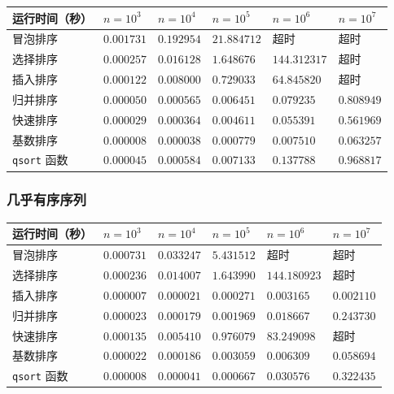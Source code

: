 \documentclass[12pt]{article}
\begin{document}
\begin{center}
  \begin{tabular}{|m{}|m{}|m{}|m{}|m{}|m{}|}
  \hline
  运行时间（秒） & $n=10^3$  & $n=10^4$ & $n=10^5$ & $n=10^6$ & $n=10^7$ \\ 
  \hline
  冒泡排序 & $0.001731$  & $0.192954$ & $21.884712$ & 超时 & 超时 \\ 
  \hline
  选择排序 & $0.000257$  & $0.016128$ & $1.648676$ & $144.312317$ & 超时 \\ 
  \hline
  插入排序 & $0.000122$  & $0.008000$ & $0.729033$ & $64.845820$ & 超时 \\ 
  \hline
  归并排序 & $0.000050$  & $0.000565$ & $0.006451$ & $0.079235$ & $0.808949$ \\ 
  \hline
  快速排序 & $0.000029$  & $0.000364$ & $0.004611$ & $0.055391$ & $0.561969$ \\ 
  \hline
  基数排序 & $0.000008$  & $0.000038$ & $0.000779$ & $0.007510$ & $0.063257$ \\ 
  \hline
  \verb|qsort| 函数 & $0.000045$  & $0.000584$ & $0.007133$ & $0.137788$ & $0.968817$ \\ 
  \hline
  \end{tabular}
\end{center}
  
\subsubsection{几乎有序序列}

\begin{center}
  \begin{tabular}{|m{}|m{}|m{}|m{}|m{}|m{}|}
  \hline
  运行时间（秒） & $n=10^3$  & $n=10^4$ & $n=10^5$ & $n=10^6$ & $n=10^7$ \\ 
  \hline
  冒泡排序 & $0.000731$  & $0.033247$ & $5.431512$ & 超时 & 超时 \\ 
  \hline
  选择排序 & $0.000236$  & $0.014007$ & $1.643990$ & $144.180923$ & 超时 \\ 
  \hline
  插入排序 & $0.000007$  & $0.000021$ & $0.000271$ & $0.003165$ & $0.002110$ \\ 
  \hline
  归并排序 & $0.000023$  & $0.000179$ & $0.001969$ & $0.018667$ & $0.243730$ \\ 
  \hline
  快速排序 & $0.000135$  & $0.005410$ & $0.976079$ & $83.249098$ & 超时 \\ 
  \hline
  基数排序 & $0.000022$  & $0.000186$ & $0.003059$ & $0.006309$ & $0.058694$ \\ 
  \hline
  \verb|qsort| 函数 & $0.000008$  & $0.000041$ & $0.000667$ & $0.030576$ & $0.322435$ \\ 
  \hline
  \end{tabular}
\end{center}
\end{document}
